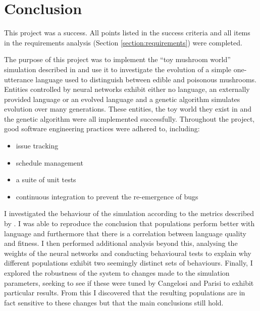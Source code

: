 \documentclass[12pt,a4paper]{report}
\begin{document}

\chapter{Conclusion}

This project was a success. All points listed in the success criteria and all items in the requirements analysis (Section \ref{section:requirements}) were completed.

The purpose of this project was to implement the ``toy mushroom world'' simulation described in \citet{Cangelosi1998} and use it to investigate the evolution of a simple one-utterance language used to distinguish between edible and poisonous mushrooms. Entities controlled by neural networks exhibit either no language, an externally provided language or an evolved language and a genetic algorithm simulates evolution over many generations. These entities, the toy world they exist in and the genetic algorithm were all implemented successfully. Throughout the project, good software engineering practices were adhered to, including:
\begin{itemize}
    \item issue tracking
    \item schedule management
    \item a suite of unit tests
    \item continuous integration to prevent the re-emergence of bugs
\end{itemize}

I investigated the behaviour of the simulation according to the metrics described by \citet{Cangelosi1998}. I was able to reproduce the conclusion that populations perform better with language and furthermore that there is a correlation between language quality and fitness. I then performed additional analysis beyond this, analysing the weights of the neural networks and conducting behavioural tests to explain why different populations exhibit two seemingly distinct sets of behaviours. Finally, I explored the robustness of the system to changes made to the simulation parameters, seeking to see if these were tuned by Cangelosi and Parisi to exhibit particular results. From this I discovered that the resulting populations are in fact sensitive to these changes but that the main conclusions still hold.
\end{document}
